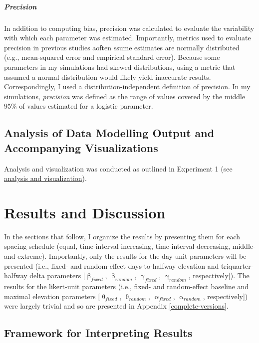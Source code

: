 \documentclass[
12pt, %
twoside,
english]{guelphthesis}
\begin{document}
\hypertarget{precision}{%
\subparagraph{Precision}\label{precision}}

In addition to computing bias, precision was calculated to evaluate the variability with which each parameter was estimated. Importantly, metrics used to evaluate precision in previous studies aoften ssume estimates are normally distributed (e.g., mean-squared error and empirical standard error). Because some parameters in my simulations had skewed distributions, using a metric that assumed a normal distribution would likely yield inaccurate results. Correspondingly, I used a distribution-independent definition of precision. In my simulations, \emph{precision} was defined as the range of values covered by the middle 95\% of values estimated for a logistic parameter.

\hypertarget{analysis-of-data-modelling-output-and-accompanying-visualizations}{%
\subsection{Analysis of Data Modelling Output and Accompanying Visualizations}\label{analysis-of-data-modelling-output-and-accompanying-visualizations}}

Analysis and visualization was conducted as outlined in Experiment 1 (see \protect\hyperlink{analysis-visualizationux5cux257D}{analysis and visualization}).

\hypertarget{results-and-discussion-1}{%
\section{Results and Discussion}\label{results-and-discussion-1}}

In the sections that follow, I organize the results by presenting them for each spacing schedule (equal, time-interval increasing, time-interval decreasing, middle-and-extreme). Importantly, only the results for the day-unit parameters will be presented (i.e., fixed- and random-effect days-to-halfway elevation and triquarter-halfway delta parameters {[}\(\upbeta_{fixed}\), \(\upbeta_{random}\), \(\upgamma_{fixed}\), \(\upgamma_{random}\), respectively{]}). The results for the likert-unit parameters (i.e., fixed- and random-effect baseline and maximal elevation parameters {[}\(\uptheta_{fixed}\), \(\uptheta_{random}\), \(\upalpha_{fixed}\), \(\upalpha_{random}\), respectively{]}) were largely trivial and so are presented in Appendix \ref{complete-versions}.

\hypertarget{framework-for-interpreting-results-1}{%
\subsection{Framework for Interpreting Results}\label{framework-for-interpreting-results-1}}
\end{document}
